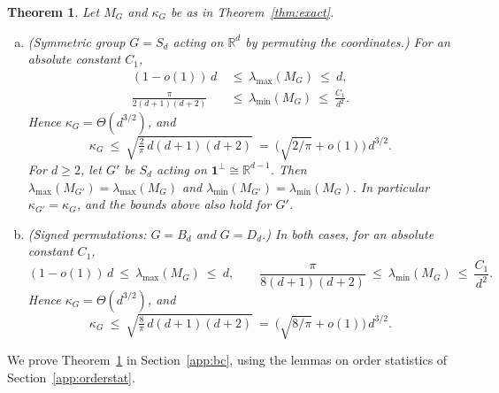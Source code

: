 \documentclass[11pt]{article}
\newcommand{\R}{\mathbb{R}}
\newtheorem{theor}{Theorem}[section]
\theoremstyle{definition}
\begin{document}
\begin{theor}
	\label{thm:growth}
	Let $M_G$ and $\kappa_G$ be as in Theorem~\ref{thm:exact}.
	\begin{enumerate}[(a)]
		\item \emph{(Symmetric group $G=S_d$ acting on $\R^d$ by permuting the coordinates.)} For an absolute constant $C_1$,
		\[
		\begin{aligned}
			(1-o(1))\,d\ &\le\ \lambda_{\max}(M_G)\ \le\ d,\\
			\frac{\pi}{2(d+1)(d+2)}\ &\le\ \lambda_{\min}(M_G)\ \le\ \frac{C_1}{d^{2}} .
		\end{aligned}
		\]
		Hence $\kappa_G=\Theta(d^{3/2})$, and
		\[
		\kappa_G\ \le\ \sqrt{\tfrac{2}{\pi}\,d(d+1)(d+2)}
		\ =\ \bigl(\sqrt{2/\pi}+o(1)\bigr)\,d^{3/2}.
		\]
		 For $d\ge2$, let $G'$ be $S_d$ acting on $\mathbf 1^{\perp}\cong\R^{d-1}$. Then
		$\lambda_{\max}(M_{G'})=\lambda_{\max}(M_G)$ and $\lambda_{\min}(M_{G'})=\lambda_{\min}(M_G)$.
		In particular $\kappa_{G'}=\kappa_G$, and the bounds above also hold for $G'$. 
		\item \emph{(Signed permutations: $G=B_d$ and $G=D_d$.)} In both
		cases, for an absolute constant $C_1$,
		\[
		(1-o(1))\,d\ \le\ \lambda_{\max}(M_G)\ \le\ d,
		\qquad
		\frac{\pi}{8(d+1)(d+2)}\ \le\ \lambda_{\min}(M_G)\ \le\ \frac{C_1}{d^{2}}.
		\]
		Hence $\kappa_G=\Theta(d^{3/2})$, and
		\[
		\kappa_G\ \le\ \sqrt{\tfrac{8}{\pi}\,d(d+1)(d+2)}
		\ =\ \bigl(\sqrt{8/\pi}+o(1)\bigr)\,d^{3/2}.
		\]
	\end{enumerate}
\end{theor}

We prove Theorem~\ref{thm:growth} in Section~\ref{app:bc}, using the lemmas on order statistics of
Section~\ref{app:orderstat}.
\end{document}
